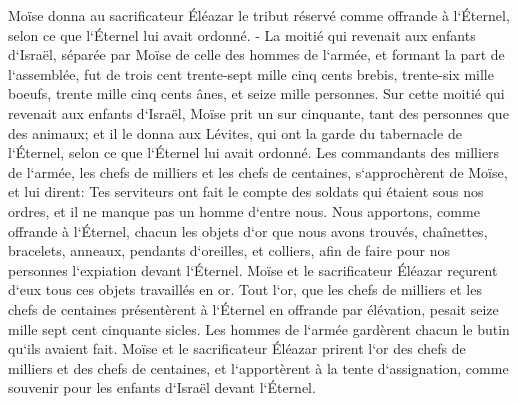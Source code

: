 \verse Moïse donna au sacrificateur Éléazar le tribut réservé comme offrande à l`Éternel, selon ce que l`Éternel lui avait ordonné. - 
\verse La moitié qui revenait aux enfants d`Israël, séparée par Moïse de celle des hommes de l`armée, 
\verse et formant la part de l`assemblée, fut de trois cent trente-sept mille cinq cents brebis, 
\verse trente-six mille boeufs, 
\verse trente mille cinq cents ânes, 
\verse et seize mille personnes. 
\verse Sur cette moitié qui revenait aux enfants d`Israël, Moïse prit un sur cinquante, tant des personnes que des animaux; et il le donna aux Lévites, qui ont la garde du tabernacle de l`Éternel, selon ce que l`Éternel lui avait ordonné. 
\verse Les commandants des milliers de l`armée, les chefs de milliers et les chefs de centaines, s`approchèrent de Moïse, 
\verse et lui dirent: Tes serviteurs ont fait le compte des soldats qui étaient sous nos ordres, et il ne manque pas un homme d`entre nous. 
\verse Nous apportons, comme offrande à l`Éternel, chacun les objets d`or que nous avons trouvés, chaînettes, bracelets, anneaux, pendants d`oreilles, et colliers, afin de faire pour nos personnes l`expiation devant l`Éternel. 
\verse Moïse et le sacrificateur Éléazar reçurent d`eux tous ces objets travaillés en or. 
\verse Tout l`or, que les chefs de milliers et les chefs de centaines présentèrent à l`Éternel en offrande par élévation, pesait seize mille sept cent cinquante sicles. 
\verse Les hommes de l`armée gardèrent chacun le butin qu`ils avaient fait. 
\verse Moïse et le sacrificateur Éléazar prirent l`or des chefs de milliers et des chefs de centaines, et l`apportèrent à la tente d`assignation, comme souvenir pour les enfants d`Israël devant l`Éternel. 

\chapter{}

